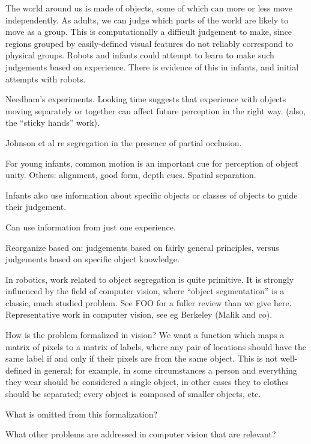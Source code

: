 

The world around us is made of objects, some of which can more or less
move independently.  As adults, we can judge which parts of the world
are likely to move as a group.  This is computationally a difficult
judgement to make, since regions grouped by easily-defined visual
features do not reliably correspond to physical groups.  Robots and
infants could attempt to learn to make such judgements based on
experience.  There is evidence of this in infants, and initial
attempts with robots.


Needham's experiments. 
\cite{needham01object,needham97object}
Looking time suggests that experience with objects moving separately
or together can affect future perception in the right way.
(also, the ``sticky hands'' work).


Johnson et al re segregation in the presence of partial occlusion.

For young infants, common motion is an important cue for 
perception of object unity.  Others: alignment, good form,
depth cues.  Spatial separation.

Infants also use information about specific objects or
classes of objects to guide their judgement.  

Can use information from just one experience.

Reorganize based on: judgements based on fairly general
principles, versus judgements based on specific object
knowledge.

In robotics, work related to object segregation is quite
primitive.  It is strongly influenced by the field
of computer vision, where ``object segmentation'' is a classic,
much studied problem.  See FOO for a fuller review than we give
here.  Representative work in computer vision,
see eg Berkeley (Malik and co).

How is the problem formalized in vision?  We want a function
which maps a matrix of pixels to a matrix of labels, where
any pair of locations should have the same label if and
only if their pixels are from the same object.
This is not well-defined in general; for example, in some
circumstances a person and everything they wear should be
considered a single object, in other cases they to clothes
should be separated; every object is composed of smaller
objects, etc.

What is omitted from this formalization?

What other problems are addressed in computer vision that
are relevant?



